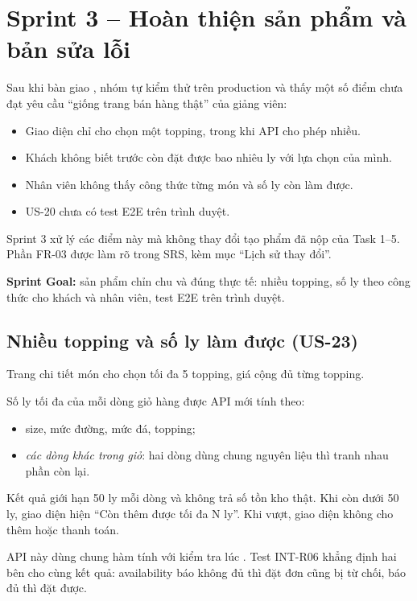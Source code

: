\section{Sprint 3 -- Hoàn thiện sản phẩm và bản sửa lỗi}\label{ch:sprint3}

Sau khi bàn giao , nhóm tự kiểm thử trên production và thấy một số điểm chưa đạt yêu cầu ``giống trang bán hàng thật'' của giảng viên:
\begin{itemize}
\item Giao diện chỉ cho chọn một topping, trong khi API cho phép nhiều.
\item Khách không biết trước còn đặt được bao nhiêu ly với lựa chọn của mình.
\item Nhân viên không thấy công thức từng món và số ly còn làm được.
\item US-20 chưa có test E2E trên trình duyệt.
\end{itemize}

Sprint 3 xử lý các điểm này mà không thay đổi tạo phẩm đã nộp của Task 1--5. Phần FR-03 được làm rõ trong SRS, kèm mục ``Lịch sử thay đổi''.

\textbf{Sprint Goal:} sản phẩm chỉn chu và đúng thực tế: nhiều topping, số ly theo công thức cho khách và nhân viên, test E2E trên trình duyệt.



\subsection{Nhiều topping và số ly làm được (US-23)}
Trang chi tiết món cho chọn tối đa 5 topping, giá cộng đủ từng topping.

Số ly tối đa của mỗi dòng giỏ hàng được API mới  tính theo:
\begin{itemize}
\item size, mức đường, mức đá, topping;
\item \emph{các dòng khác trong giỏ}: hai dòng dùng chung nguyên liệu thì tranh nhau phần còn lại.
\end{itemize}

Kết quả giới hạn 50 ly mỗi dòng và không trả số tồn kho thật. Khi còn dưới 50 ly, giao diện hiện ``Còn thêm được tối đa N ly''. Khi vượt, giao diện không cho thêm hoặc thanh toán.

API này dùng chung hàm tính với kiểm tra lúc . Test INT-R06 khẳng định hai bên cho cùng kết quả: availability báo không đủ thì đặt đơn cũng bị từ chối, báo đủ thì đặt được.

